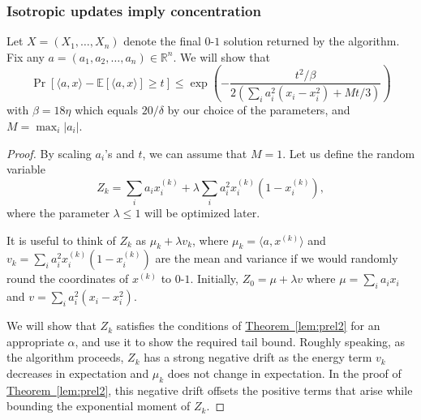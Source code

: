 \documentclass[11pt]{article}
\newcommand{\ip}[1]{\langle #1 \rangle}
\newcommand{\E}{\mathbb{E}}
\theoremstyle{definition}
\newcommand{\expref}[2]{\texorpdfstring{\hyperref[#2]{#1~\ref{#2}}}{#1~\ref{#2}}}
\newcommand{\R}{{\mathbb R}}
\begin{document}
\subsubsection{Isotropic updates imply concentration}
Let $X=(X_1,\ldots,X_n)$ denote the final $0$-$1$ solution returned by the algorithm. Fix any $a=(a_1,a_2,\ldots,a_n) \in \R^n$. We will show that
\[ \Pr[\ip{a,x} - \E[\ip{a,x}]  \geq t] \leq \exp \left( - \frac{t^2/\beta}{2 (\sum_i a_i^2(x_i-x_i^2) + Mt/3)} \right)  \]
with $\beta = 18 \eta$ which equals $20/\delta$ by our choice of the parameters, and $M=\max_i |a_i|$.
\begin{proof} By scaling $a_i$'s and $t$, we can assume that $M=1$.
Let us define the random variable
\[ Z_k = \sum_i a_i x_i^{(k)} + \lambda \sum_i  a_i^2 x_i^{(k)}(1-x_i^{(k)}),\]
where the parameter $\lambda \leq 1$ will be optimized later.

It is useful to think of $Z_k$ as $\mu_k + \lambda v_k$, where $\mu_k = \langle a,x^{(k)} \rangle $ and $v_k =\sum_i  a_i^2 x_i^{(k)}(1-x_i^{(k)})$ are the mean and variance if we would randomly round the coordinates of $x^{(k)}$ to $0$-$1$. Initially, 
$Z_0 = \mu + \lambda v$ where $\mu = \sum_i a_i x_i$ and $v =  \sum_i a_i^2 ( x_i-x_i^2)$. 

We will show that $Z_k$ satisfies the conditions of \expref{Theorem}{lem:prel2} for an appropriate $\alpha$, and use it to show the required tail bound. Roughly speaking, as the algorithm proceeds, $Z_k$ has a strong negative drift as the energy term $v_k$ decreases in expectation and $\mu_k$ does not change in expectation. In the proof of \expref{Theorem}{lem:prel2}, this negative drift offsets the positive terms that arise while bounding the exponential moment of $Z_k$.



\end{proof}
\end{document}
